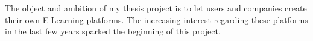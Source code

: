 The object and ambition of my thesis project is to let users and companies create their own E-Learning platforms.
The increasing interest regarding these platforms in the last few years sparked the beginning of this project.